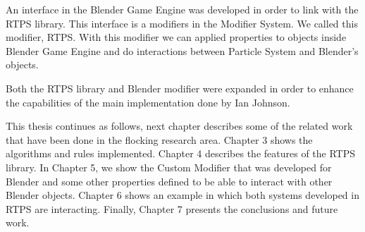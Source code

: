 An interface in the Blender Game Engine was developed in order to link with the RTPS library. This interface is a modifiers in the Modifier System. We called this modifier, RTPS. With this modifier we can applied properties to objects inside Blender Game Engine and do interactions between Particle System and Blender's objects.

Both the RTPS library and Blender modifier were expanded in order to enhance the capabilities of the main implementation done by Ian Johnson.


This thesis continues as follows, next chapter describes some of the related work that have been done in the flocking research area. Chapter 3 shows the algorithms and rules implemented. Chapter 4 describes the features of the RTPS library. In Chapter 5, we show the Custom Modifier that was developed for Blender and some other properties defined to be able to interact with other Blender objects. Chapter 6 shows an example in which both systems developed in RTPS are interacting. Finally, Chapter 7 presents the conclusions and future work. 
